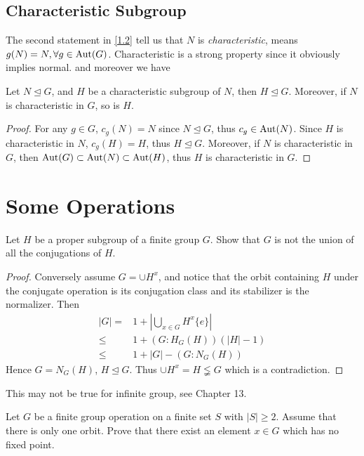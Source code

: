 \subsection{Characteristic Subgroup}
The second statement in \ref{1.2} tell us that $N$ is \emph{\red  characteristic}, means $g(N)=N, \forall g\in\operatorname{Aut}(G)$.
Characteristic is a strong property since it obviously implies normal. and moreover we have
\begin{prop}
Let $N\trianglelefteq G$, and $H$ be a characteristic subgroup of $N$, then $H\trianglelefteq G$. Moreover, if $N$ is characteristic in $G$, so is $H$.
\end{prop}
\begin{proof}
  For any $g\in G$, $c_g(N)=N$ since $N\trianglelefteq G$, thus $c_g\in\operatorname{Aut}(N)$. Since $H$ is characteristic in $N$, $c_g(H)=H$, thus $H\trianglelefteq G$.
  Moreover, if $N$ is characteristic in $G$, then $\operatorname{Aut}(G)\subset\operatorname{Aut}(N)\subset\operatorname{Aut}(H)$, thus $H$ is characteristic in $G$.
\end{proof}
\newpage\section{Some Operations}
\begin{ex}\label{16}
  Let $H$ be a proper subgroup of a finite group $G$. Show that $G$ is not the union of all the conjugations of $H$.
\end{ex}
\begin{proof}
  Conversely assume $G=\cup H^x$, and notice that the orbit containing $H$ under the conjugate operation is its conjugation class and its stabilizer is the normalizer. Then
  \begin{align*}
    |G|=&1+|\bigcup_{x\in G}H^x\{e\}|  \\
    \leqslant&1+(G:H_G(H))(|H|-1)\\
    \leqslant&1+|G|-(G:N_G(H))
  \end{align*}
  Hence $G=N_G(H)$, $H\trianglelefteq G$. Thus $\cup H^x=H\lneqq G$ which is a contradiction.
\end{proof}
\begin{warn}
  This may not be true for infinite group, see Chapter 13.
\end{warn}
\begin{ex}
  Let $G$ be a finite group operation on a finite set $S$ with $|S|\geqslant2$. Assume that there is only one orbit. Prove that there exist an element $x\in G$ which has no fixed point.
\end{ex}
